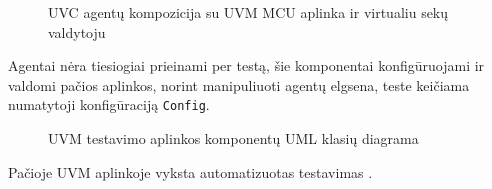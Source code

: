 \begin{figure}[H]
	
	\caption{UVC agentų kompozicija su UVM MCU aplinka ir virtualiu sekų valdytoju}
	\label{fig:uml_class_tb_env_uvc}
\end{figure}

Agentai nėra tiesiogiai prieinami per testą, šie komponentai konfigūruojami ir valdomi pačios aplinkos, norint manipuliuoti agentų elgsena, teste keičiama numatytoji konfigūraciją \texttt{Config}.

\begin{figure}[H]
	
	\caption{UVM testavimo aplinkos komponentų UML klasių diagrama}
	\label{fig:uml_class_tb_env}
\end{figure}

Pačioje UVM aplinkoje vyksta automatizuotas testavimas \pav{\ref{fig:uml_class_tb_env}}.

